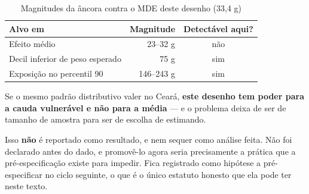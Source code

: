 \begin{table}[htbp]
\centering
\caption{Magnitudes da âncora contra o MDE deste desenho (33,4 g)}
\label{tab:mde-cauda}
\small
\begin{tabular}{lrc}
\toprule
\textbf{Alvo em \citet{reynier2025glyphosate}} & \textbf{Magnitude} & \textbf{Detectável aqui?} \\
\midrule
Efeito médio                       & 23--32 g   & não \\
Decil inferior de peso esperado    & 75 g       & sim \\
Exposição no percentil 90          & 146--243 g & sim \\
\bottomrule
\end{tabular}
\end{table}

Se o mesmo padrão distributivo valer no Ceará, \textbf{este desenho tem poder
para a cauda vulnerável e não para a média} --- e o problema deixa de ser de
tamanho de amostra para ser de escolha de estimando.

Isso \textbf{não} é reportado como resultado, e nem sequer como análise feita.
Não foi declarado antes do dado, e promovê-lo agora seria precisamente a prática
que a pré-especificação existe para impedir. Fica registrado como hipótese a
pré-especificar no ciclo seguinte, o que é o único estatuto honesto que ela pode
ter neste texto.
